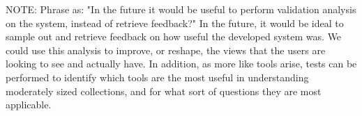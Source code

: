 \documentclass[10pt,journal,compsoc]{IEEEtran}
\begin{document}
NOTE: Phrase as: "In the future it would be useful to perform validation analysis on the system, instead of retrieve feedback?"
In the future, it would be ideal to sample out and retrieve feedback on how useful the developed system was. We could use this analysis to improve, or reshape, the views that the users are looking to see and actually have. In addition, as more like tools arise, tests can be performed to identify which tools are the most useful in understanding moderately sized collections, and for what sort of questions they are most applicable. \par


\ifCLASSOPTIONcaptionsoff
  \newpage
\fi




{}


%
%
\end{document}
